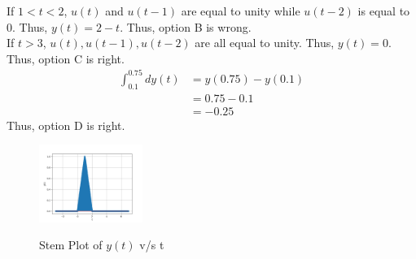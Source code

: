 \documentclass[journal,12pt,twocolumn]{IEEEtran}
\theoremstyle{remark}
\begin{document}
If $1<t<2$, $u(t)$ and $u(t-1)$ are equal to unity while $u(t-2)$ is equal to 0. Thus, $y(t) = 2-t$. Thus, option B is wrong.\\

If $t>3$, $u(t), u(t-1), u(t-2)$ are all equal to unity. Thus, $y(t) = 0$. Thus, option C is right.\\

\begin{align}
    \int_{0.1} ^ {0.75} dy(t) &= y(0.75) - y(0.1) \\
    &= 0.75 - 0.1\\
    &= -0.25
\end{align}
Thus, option D is right.\\
\begin{figure}[h]
    \includegraphics[width=0.3\textwidth]{figs/y(t)_vs_t.png}\label{fig:y(t)_vs_t}
    \caption{Stem Plot of $y(t)$ v/s t}
\end{figure}
\end{document}

